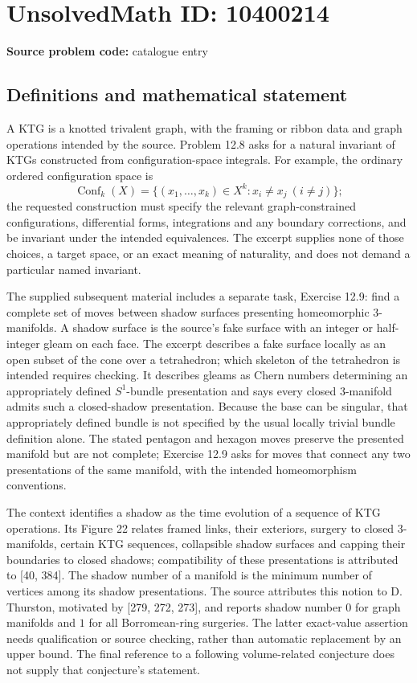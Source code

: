 \documentclass[11pt]{article}
\begin{document}
\section*{UnsolvedMath ID: 10400214}
\textbf{Source problem code:} catalogue entry
\subsection{Definitions and mathematical statement}
A KTG is a knotted trivalent graph, with the framing or ribbon data and graph operations intended by the source. Problem 12.8 asks for a natural invariant of KTGs constructed from configuration-space integrals. For example, the ordinary ordered configuration space is
\[
 \operatorname{Conf}_k(X)=\{(x_1,\ldots,x_k)\in X^k:x_i\ne x_j\ (i\ne j)\};
\]
the requested construction must specify the relevant graph-constrained configurations, differential forms, integrations and any boundary corrections, and be invariant under the intended equivalences. The excerpt supplies none of those choices, a target space, or an exact meaning of naturality, and does not demand a particular named invariant.

The supplied subsequent material includes a separate task, Exercise 12.9: find a complete set of moves between shadow surfaces presenting homeomorphic \(3\)-manifolds. A shadow surface is the source's fake surface with an integer or half-integer gleam on each face. The excerpt describes a fake surface locally as an open subset of the cone over a tetrahedron; which skeleton of the tetrahedron is intended requires checking. It describes gleams as Chern numbers determining an appropriately defined \(S^1\)-bundle presentation and says every closed \(3\)-manifold admits such a closed-shadow presentation. Because the base can be singular, that appropriately defined bundle is not specified by the usual locally trivial bundle definition alone. The stated pentagon and hexagon moves preserve the presented manifold but are not complete; Exercise 12.9 asks for moves that connect any two presentations of the same manifold, with the intended homeomorphism conventions.

The context identifies a shadow as the time evolution of a sequence of KTG operations. Its Figure 22 relates framed links, their exteriors, surgery to closed \(3\)-manifolds, certain KTG sequences, collapsible shadow surfaces and capping their boundaries to closed shadows; compatibility of these presentations is attributed to [40, 384]. The shadow number of a manifold is the minimum number of vertices among its shadow presentations. The source attributes this notion to D. Thurston, motivated by [279, 272, 273], and reports shadow number \(0\) for graph manifolds and \(1\) for all Borromean-ring surgeries. The latter exact-value assertion needs qualification or source checking, rather than automatic replacement by an upper bound. The final reference to a following volume-related conjecture does not supply that conjecture's statement.
\end{document}
